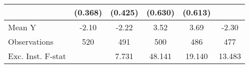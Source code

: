 {\begin{tabular}{l*{5}{c}}
            &     (0.368)         &     (0.425)         &     (0.630)         &     (0.613)         &                     \\
\midrule
Mean Y      &       -2.10         &       -2.22         &        3.52         &        3.69         &       -2.30         \\
Observations&         520         &         491         &         500         &         486         &         477         \\
Exc. Inst. F-stat&                     &       7.731         &      48.141         &      19.140         &      13.483         \\
\bottomrule
\end{tabular}
}
